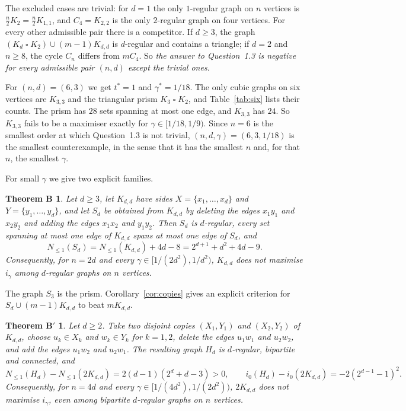 \documentclass[11pt]{article}
\newtheorem*{thmB}{Theorem B}
\newtheorem*{thmBp}{Theorem B$'$}
\theoremstyle{remark}
\newcommand{\Nle}[1]{N_{\le #1}}
\newcommand{\cart}{\mathbin{\square}}
\begin{document}
The excluded cases are trivial: for $d=1$ the only $1$-regular graph on $n$
vertices is $\frac n2K_2=\frac n2K_{1,1}$, and $C_4=K_{2,2}$ is the only
$2$-regular graph on four vertices. For every other admissible pair there is a
competitor. If $d\ge3$, the graph $(K_d\cart K_2)\cup(m-1)K_{d,d}$ is
$d$-regular and contains a triangle; if $d=2$ and $n\ge8$, the cycle $C_n$
differs from $mC_4$. So \emph{the answer to Question~1.3 is negative for every
admissible pair $(n,d)$ except the trivial ones.}

For $(n,d)=(6,3)$ we get $t^*=1$ and $\gamma^*=1/18$. The only cubic graphs on
six vertices are $K_{3,3}$ and the triangular prism $K_3\cart K_2$, and
Table~\ref{tab:six} lists their counts. The prism has $28$ sets spanning at
most one edge, and $K_{3,3}$ has $24$. So $K_{3,3}$ fails to be a maximiser
exactly for $\gamma\in[1/18,1/9)$. Since $n=6$ is the smallest order at which
Question~1.3 is not trivial, $(n,d,\gamma)=(6,3,1/18)$ is the smallest
counterexample, in the sense that it has the smallest $n$ and, for that $n$,
the smallest $\gamma$.

For small $\gamma$ we give two explicit families.

\begin{thmB}
Let $d\ge3$, let $K_{d,d}$ have sides $X=\{x_1,\dots,x_d\}$ and
$Y=\{y_1,\dots,y_d\}$, and let $S_d$ be obtained from $K_{d,d}$ by deleting
the edges $x_1y_1$ and $x_2y_2$ and adding the edges $x_1x_2$ and $y_1y_2$.
Then $S_d$ is $d$-regular, every set spanning at most one edge of $K_{d,d}$
spans at most one edge of $S_d$, and
\[
 \Nle1(S_d)=\Nle1(K_{d,d})+4d-8=2^{d+1}+d^2+4d-9.
\]
Consequently, for $n=2d$ and every $\gamma\in[1/(2d^2),1/d^2)$, $K_{d,d}$
does not maximise $i_\gamma$ among $d$-regular graphs on $n$ vertices.
\end{thmB}

The graph $S_3$ is the prism. Corollary~\ref{cor:copies} gives an explicit
criterion for $S_d\cup(m-1)K_{d,d}$ to beat $mK_{d,d}$.

\begin{thmBp}
Let $d\ge2$. Take two disjoint copies $(X_1,Y_1)$ and $(X_2,Y_2)$ of
$K_{d,d}$, choose $u_k\in X_k$ and $w_k\in Y_k$ for $k=1,2$, delete the edges
$u_1w_1$ and $u_2w_2$, and add the edges $u_1w_2$ and $u_2w_1$. The resulting
graph $H_d$ is $d$-regular, bipartite and connected, and
\[
 \Nle1(H_d)-\Nle1(2K_{d,d})=2(d-1)(2^d+d-3)>0,\qquad
 i_0(H_d)-i_0(2K_{d,d})=-2(2^{d-1}-1)^2.
\]
Consequently, for $n=4d$ and every $\gamma\in[1/(4d^2),1/(2d^2))$,
$2K_{d,d}$ does not maximise $i_\gamma$, even among bipartite $d$-regular
graphs on $n$ vertices.
\end{thmBp}
\end{document}
